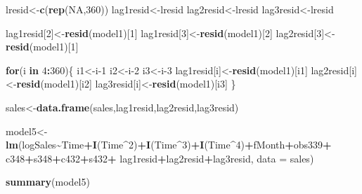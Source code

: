\documentclass[
]{article}
\newenvironment{Shaded}{\begin{snugshade}}{\end{snugshade}}
\newcommand{\AttributeTok}[1]{\textcolor[rgb]{0.13,0.29,0.53}{#1}}
\newcommand{\ConstantTok}[1]{\textcolor[rgb]{0.56,0.35,0.01}{#1}}
\newcommand{\ControlFlowTok}[1]{\textcolor[rgb]{0.13,0.29,0.53}{\textbf{#1}}}
\newcommand{\DecValTok}[1]{\textcolor[rgb]{0.00,0.00,0.81}{#1}}
\newcommand{\FunctionTok}[1]{\textcolor[rgb]{0.13,0.29,0.53}{\textbf{#1}}}
\newcommand{\NormalTok}[1]{#1}
\newcommand{\OtherTok}[1]{\textcolor[rgb]{0.56,0.35,0.01}{#1}}
\newcommand{\SpecialCharTok}[1]{\textcolor[rgb]{0.81,0.36,0.00}{\textbf{#1}}}
\begin{document}
\begin{Shaded}
\begin{Highlighting}[]
\NormalTok{lresid}\OtherTok{\textless{}{-}}\FunctionTok{c}\NormalTok{(}\FunctionTok{rep}\NormalTok{(}\ConstantTok{NA}\NormalTok{,}\DecValTok{360}\NormalTok{))}
\NormalTok{lag1resid}\OtherTok{\textless{}{-}}\NormalTok{lresid}
\NormalTok{lag2resid}\OtherTok{\textless{}{-}}\NormalTok{lresid}
\NormalTok{lag3resid}\OtherTok{\textless{}{-}}\NormalTok{lresid}

\NormalTok{lag1resid[}\DecValTok{2}\NormalTok{]}\OtherTok{\textless{}{-}}\FunctionTok{resid}\NormalTok{(model1)[}\DecValTok{1}\NormalTok{]}
\NormalTok{lag1resid[}\DecValTok{3}\NormalTok{]}\OtherTok{\textless{}{-}}\FunctionTok{resid}\NormalTok{(model1)[}\DecValTok{2}\NormalTok{]}
\NormalTok{lag2resid[}\DecValTok{3}\NormalTok{]}\OtherTok{\textless{}{-}}\FunctionTok{resid}\NormalTok{(model1)[}\DecValTok{1}\NormalTok{]}

\ControlFlowTok{for}\NormalTok{(i }\ControlFlowTok{in} \DecValTok{4}\SpecialCharTok{:}\DecValTok{360}\NormalTok{)\{}
\NormalTok{i1}\OtherTok{\textless{}{-}}\NormalTok{i}\DecValTok{{-}1}
\NormalTok{i2}\OtherTok{\textless{}{-}}\NormalTok{i}\DecValTok{{-}2}
\NormalTok{i3}\OtherTok{\textless{}{-}}\NormalTok{i}\DecValTok{{-}3}
\NormalTok{lag1resid[i]}\OtherTok{\textless{}{-}}\FunctionTok{resid}\NormalTok{(model1)[i1]}
\NormalTok{lag2resid[i]}\OtherTok{\textless{}{-}}\FunctionTok{resid}\NormalTok{(model1)[i2]}
\NormalTok{lag3resid[i]}\OtherTok{\textless{}{-}}\FunctionTok{resid}\NormalTok{(model1)[i3]}
\NormalTok{\}}
\end{Highlighting}
\end{Shaded}

\begin{Shaded}
\begin{Highlighting}[]
\NormalTok{sales}\OtherTok{\textless{}{-}}\FunctionTok{data.frame}\NormalTok{(sales,lag1resid,lag2resid,lag3resid)}
\end{Highlighting}
\end{Shaded}

\begin{Shaded}
\begin{Highlighting}[]
\NormalTok{model5}\OtherTok{\textless{}{-}}\FunctionTok{lm}\NormalTok{(logSales}\SpecialCharTok{\textasciitilde{}}\NormalTok{Time}\SpecialCharTok{+}\FunctionTok{I}\NormalTok{(Time}\SpecialCharTok{\^{}}\DecValTok{2}\NormalTok{)}\SpecialCharTok{+}\FunctionTok{I}\NormalTok{(Time}\SpecialCharTok{\^{}}\DecValTok{3}\NormalTok{)}\SpecialCharTok{+}\FunctionTok{I}\NormalTok{(Time}\SpecialCharTok{\^{}}\DecValTok{4}\NormalTok{)}\SpecialCharTok{+}\NormalTok{fMonth}\SpecialCharTok{+}\NormalTok{obs339}\SpecialCharTok{+}
\NormalTok{             c348}\SpecialCharTok{+}\NormalTok{s348}\SpecialCharTok{+}\NormalTok{c432}\SpecialCharTok{+}\NormalTok{s432}\SpecialCharTok{+}
\NormalTok{             lag1resid}\SpecialCharTok{+}\NormalTok{lag2resid}\SpecialCharTok{+}\NormalTok{lag3resid, }\AttributeTok{data =}\NormalTok{ sales)}

\FunctionTok{summary}\NormalTok{(model5)}
\end{Highlighting}
\end{Shaded}
\end{document}
